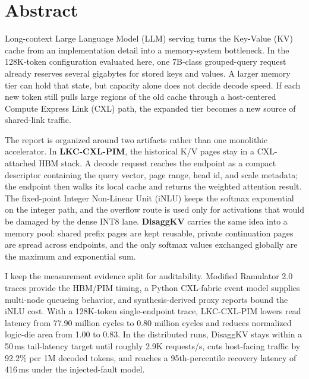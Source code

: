 \documentclass[11pt,a4paper,oneside]{book}
\begin{document}
\cleardoublepage
\frontmatter

\chapter*{Abstract}
Long-context Large Language Model (LLM) serving turns the Key-Value (KV) cache from an implementation detail into a memory-system bottleneck. In the 128K-token configuration evaluated here, one 7B-class grouped-query request already reserves several gigabytes for stored keys and values. A larger memory tier can hold that state, but capacity alone does not decide decode speed. If each new token still pulls large regions of the old cache through a host-centered Compute Express Link (CXL) path, the expanded tier becomes a new source of shared-link traffic.

The report is organized around two artifacts rather than one monolithic accelerator. In \textbf{LKC-CXL-PIM}, the historical K/V pages stay in a CXL-attached HBM stack. A decode request reaches the endpoint as a compact descriptor containing the query vector, page range, head id, and scale metadata; the endpoint then walks its local cache and returns the weighted attention result. The fixed-point Integer Non-Linear Unit (iNLU) keeps the softmax exponential on the integer path, and the overflow route is used only for activations that would be damaged by the dense INT8 lane. \textbf{DisaggKV} carries the same idea into a memory pool: shared prefix pages are kept reusable, private continuation pages are spread across endpoints, and the only softmax values exchanged globally are the maximum and exponential sum.

I keep the measurement evidence split for auditability. Modified Ramulator 2.0 traces provide the HBM/PIM timing, a Python CXL-fabric event model supplies multi-node queueing behavior, and synthesis-derived proxy reports bound the iNLU cost. With a 128K-token single-endpoint trace, LKC-CXL-PIM lowers read latency from 77.90 million cycles to 0.80 million cycles and reduces normalized logic-die area from 1.00 to 0.83. In the distributed runs, DisaggKV stays within a 50\,ms tail-latency target until roughly 2.9K requests/s, cuts host-facing traffic by 92.2\% per 1M decoded tokens, and reaches a 95th-percentile recovery latency of 416\,ms under the injected-fault model.

\tableofcontents
\listoffigures
\listoftables

\mainmatter











\backmatter


\end{document}
